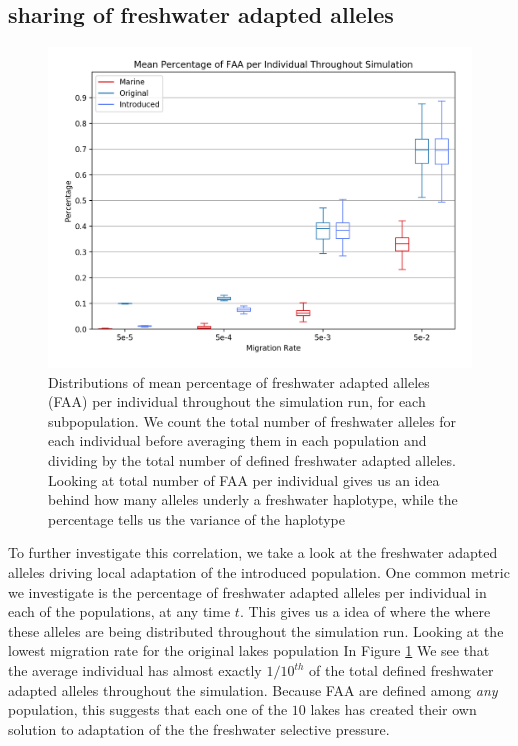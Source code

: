 \documentclass{article}
\begin{document}

 
\subsection*{sharing of freshwater adapted alleles}

\begin{figure}
	\begin{center}
  		\includegraphics[width=\linewidth]{matplotlibPlots/MPFAI.png}
  		\caption{Distributions of mean percentage of freshwater adapted alleles (FAA) per individual throughout the simulation run, for each subpopulation.
		We count the total number of freshwater alleles for each individual before averaging them in each population and dividing by the total number of defined
		freshwater adapted alleles.
		Looking at total number of FAA per individual gives us an idea behind how many alleles underly a freshwater haplotype, 
		while the percentage tells us the variance of the haplotype}
		\label{fig:MPFAI}
	\end{center}
\end{figure}

To further investigate this correlation, we take a look at the freshwater adapted alleles driving 
local adaptation of the introduced population. 
One common metric we investigate is the percentage of freshwater adapted alleles per individual in each of the populations, at any time $t$. 
This gives us a idea of where the where these alleles are being distributed throughout the simulation run. 
Looking at the lowest migration rate for the original lakes population In Figure \ref{fig:MPFAI}
We see that the average individual has almost exactly $1/10^{th}$ of the total defined freshwater adapted alleles throughout the simulation. 
Because FAA are defined among \textit{any} population, this suggests that each one of the $10$ 
lakes has created their own solution to adaptation of the the freshwater selective pressure. 
\end{document}
